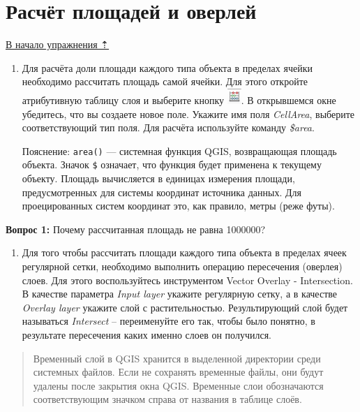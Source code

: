 \documentclass[
  12pt,
]{book}
\providecommand{\tightlist}{%
  \setlength{\itemsep}{0pt}\setlength{\parskip}{0pt}}
\begin{document}
\hypertarget{spatrelations-overlay}{%
\section{Расчёт площадей и оверлей}\label{spatrelations-overlay}}

\protect\hyperlink{spatrelations}{В начало упражнения ⇡}

\begin{enumerate}
\def\labelenumi{\arabic{enumi}.}
\item
  Для расчёта доли площади каждого типа объекта в пределах ячейки необходимо рассчитать площадь самой ячейки. Для этого откройте атрибутивную таблицу слоя и выберите кнопку \includegraphics{images/Ex06_SpatRelations/FieldCalculator.png}. В открывшемся окне убедитесь, что вы создаете новое поле. Укажите имя поля \emph{CellArea}, выберите соответствующий тип поля. Для расчёта используйте команду \emph{\$area}.

  Пояснение: \texttt{area()} --- системная функция QGIS, возвращающая площадь объекта. Значок \texttt{\$} означает, что функция будет применена к текущему объекту. Площадь вычисляется в единицах измерения площади, предусмотренных для системы координат источника данных. Для проецированных систем координат это, как правило, метры (реже футы).
\end{enumerate}

\textbf{Вопрос 1:} Почему рассчитанная площадь не равна 1000000?

\begin{enumerate}
\def\labelenumi{\arabic{enumi}.}
\setcounter{enumi}{1}
\tightlist
\item
  Для того чтобы рассчитать площади каждого типа объекта в пределах ячеек регулярной сетки, необходимо выполнить операцию пересечения (оверлея) слоев. Для этого воспользуйтесь инструментом Vector Overlay - Intersection. В качестве параметра \emph{Input layer} укажите регулярную сетку, а в качестве \emph{Overlay layer} укажите слой с растительностью. Результирующий слой будет называться \emph{Intersect} -- переименуйте его так, чтобы было понятно, в результате пересечения каких именно слоев он получился.
\end{enumerate}

\begin{quote}
Временный слой в QGIS хранится в выделенной директории среди системных файлов. Если не сохранять временные файлы, они будут удалены после закрытия окна QGIS. Временные слои обозначаются соответствующим значком справа от названия в таблице слоёв.
\end{quote}
\end{document}
